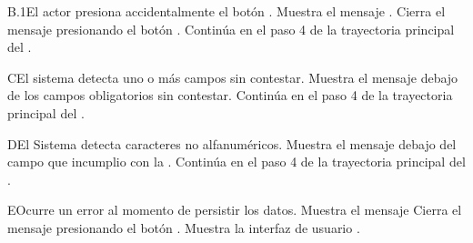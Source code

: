 \begin{UCtrayectoriaA}{B.1}{El actor presiona accidentalmente el botón .}
    \UCpaso Muestra el mensaje .
    \UCpaso[\UCactor] Cierra el mensaje presionando el botón .
    \UCpaso Continúa en el paso 4 de la trayectoria principal del .
\end{UCtrayectoriaA}
\begin{UCtrayectoriaA}{C}{El sistema detecta uno o más campos sin contestar.}
    \UCpaso Muestra el mensaje  debajo de los campos obligatorios sin contestar.
    \UCpaso Continúa en el paso 4 de la trayectoria principal del .
\end{UCtrayectoriaA}
\begin{UCtrayectoriaA}{D}{El Sistema detecta caracteres no alfanuméricos.}
    \UCpaso Muestra el mensaje  debajo del campo que incumplio con la .
    \UCpaso Continúa en el paso 4 de la trayectoria principal del .
\end{UCtrayectoriaA}
\begin{UCtrayectoriaA}{E}{Ocurre un error al momento de persistir los datos.}
    \UCpaso Muestra el mensaje 
    \UCpaso[\UCactor] Cierra el mensaje presionando el botón .
    \UCpaso Muestra la interfaz de usuario .
\end{UCtrayectoriaA}
